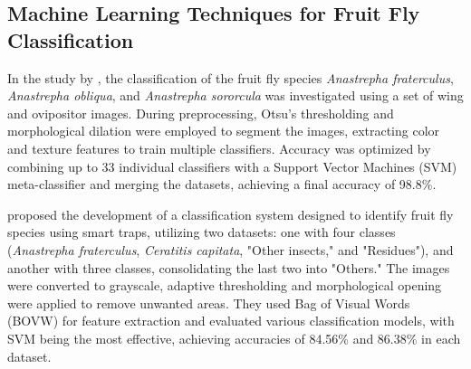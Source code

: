 \subsection{Machine Learning Techniques for Fruit Fly Classification}

In the study by \cite{7Faria2014}, the classification of the fruit fly species \textit{Anastrepha fraterculus}, \textit{Anastrepha obliqua}, and \textit{Anastrepha sororcula} was investigated using a set of wing and ovipositor images. During preprocessing, Otsu's thresholding and morphological dilation were employed to segment the images, extracting color and texture features to train multiple classifiers. Accuracy was optimized by combining up to 33 individual classifiers with a Support Vector Machines (SVM) meta-classifier and merging the datasets, achieving a final accuracy of 98.8\%.

\cite{8Remboski2018} proposed the development of a classification system designed to identify fruit fly species using smart traps, utilizing two datasets: one with four classes (\textit{Anastrepha fraterculus}, \textit{Ceratitis capitata}, "Other insects," and "Residues"), and another with three classes, consolidating the last two into "Others." The images were converted to grayscale, adaptive thresholding and morphological opening were applied to remove unwanted areas. They used Bag of Visual Words (BOVW) for feature extraction and evaluated various classification models, with SVM being the most effective, achieving accuracies of 84.56\% and 86.38\% in each dataset.
